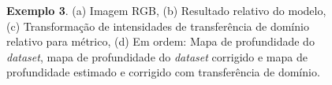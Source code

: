 \begin{figure}[H]
    \centering
    \caption{\textbf{Exemplo 3}. (a) Imagem RGB, (b) Resultado relativo do modelo, (c) Transformação de intensidades de transferência de domínio relativo para métrico, (d) Em ordem: Mapa de profundidade do \textit{dataset}, mapa de profundidade do \textit{dataset} corrigido e mapa de profundidade estimado e corrigido com transferência de domínio.}

    \label{ex127}
\end{figure}

